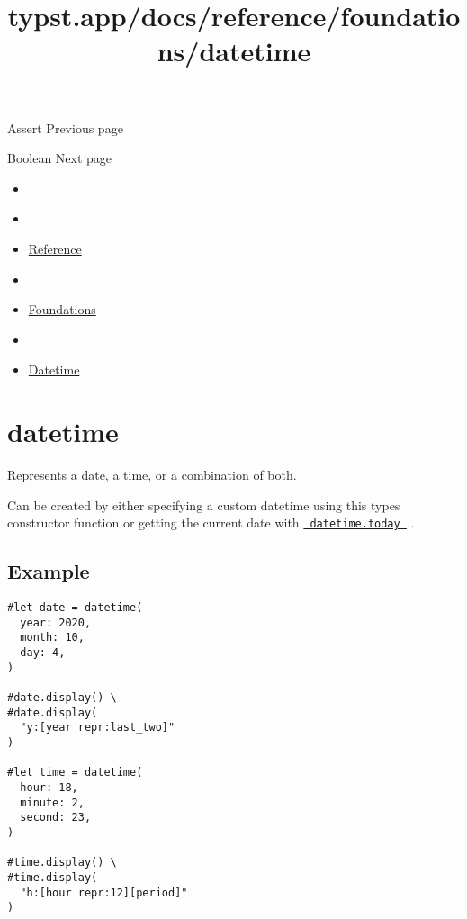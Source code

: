 { Assert } { Previous page }

\href{/docs/reference/foundations/bool/}{\pandocbounded{}}

{ Boolean } { Next page }


\title{typst.app/docs/reference/foundations/datetime}

\begin{itemize}
\tightlist
\item
  \href{/docs}{}
\item
  
\item
  \href{/docs/reference/}{Reference}
\item
  
\item
  \href{/docs/reference/foundations/}{Foundations}
\item
  
\item
  \href{/docs/reference/foundations/datetime/}{Datetime}
\end{itemize}

\section{\texorpdfstring{{ datetime }}{ datetime }}\label{summary}

Represents a date, a time, or a combination of both.

Can be created by either specifying a custom datetime using this
type\textquotesingle s constructor function or getting the current date
with
\href{/docs/reference/foundations/datetime/\#definitions-today}{\texttt{\ datetime.today\ }}
.

\subsection{Example}\label{example}

\begin{verbatim}
#let date = datetime(
  year: 2020,
  month: 10,
  day: 4,
)

#date.display() \
#date.display(
  "y:[year repr:last_two]"
)

#let time = datetime(
  hour: 18,
  minute: 2,
  second: 23,
)

#time.display() \
#time.display(
  "h:[hour repr:12][period]"
)
\end{verbatim}

